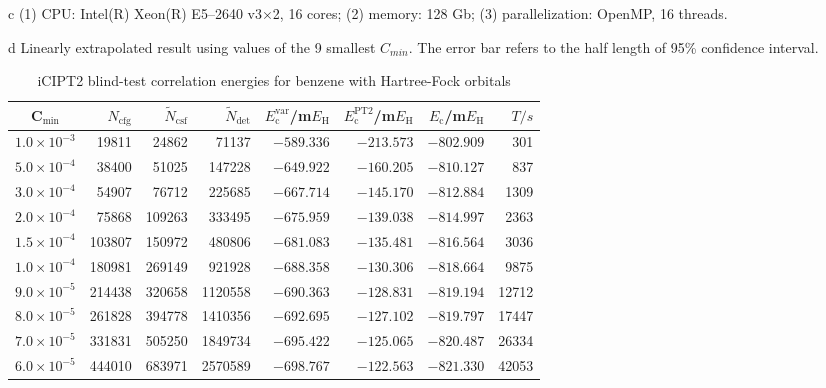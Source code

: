 \documentclass[journal=jcp,manuscript=suppinfo]{achemso}
\begin{document}
\begin{table}[!htp]
\begin{threeparttable}
\begin{tablenotes}
\item[c](1) CPU: Intel(R) Xeon(R) E5--2640 v3$\times$2, 16 cores; (2) memory: 128 Gb;
			(3) parallelization: OpenMP, 16 threads.
\item[d]Linearly extrapolated result using values of the 9 smallest $C_{min}$. The error bar refers to the half length of 95\% confidence interval.
		\end{tablenotes}
	\end{threeparttable}
	\label{OldNO}
\end{table}

\begin{table}[!htp]
	\small
	\caption{iCIPT2 blind-test correlation energies for benzene with Hartree-Fock orbitals }
	\begin{threeparttable}
		\centering
	\begin{tabular}{c|rrrrrrr}\toprule
		C$_{\text{min}}$&$N_{\mathrm{cfg}}$&$\tilde{N}_{\mathrm{csf}}$\tnote{a}&$\tilde{N}_{\mathrm{det}}$\tnote{b}
		&$E_{\mathrm{c}}^{\mathrm{var}}$/m$E_{\text{H}}$&$E_{\mathrm{c}}^{\mathrm{PT2}}$/m$E_{\text{H}}$&$E_{\mathrm{c}}$/m$E_{\text{H}}$&$T/s$\tnote{c}\\\toprule
			$1.0\times10^{-3}$ &    19811 &    24862 &  71137&  $-589.336$  &  $-213.573$&  $-802.909$ &301  \\
			$5.0\times10^{-4}$ &    38400 &    51025 & 147228&  $-649.922$  &  $-160.205$&  $-810.127$ &837  \\
			$3.0\times10^{-4}$ &    54907 &    76712 & 225685&  $-667.714$  &  $-145.170$&  $-812.884$ &1309 \\
			$2.0\times10^{-4}$ &    75868 &   109263 & 333495&  $-675.959$  &  $-139.038$&  $-814.997$ &2363 \\
			$1.5\times10^{-4}$ &   103807 &   150972 & 480806&  $-681.083$  &  $-135.481$&  $-816.564$ &3036 \\
			$1.0\times10^{-4}$ &   180981 &   269149 & 921928&  $-688.358$  &  $-130.306$&  $-818.664$ &9875 \\
			$9.0\times10^{-5}$ &   214438 &   320658 &1120558&  $-690.363$  &  $-128.831$&  $-819.194$ &12712\\
			$8.0\times10^{-5}$ &   261828 &   394778 &1410356&  $-692.695$  &  $-127.102$&  $-819.797$ &17447\\
			$7.0\times10^{-5}$ &   331831 &   505250 &1849734&  $-695.422$  &  $-125.065$&  $-820.487$ &26334\\
			$6.0\times10^{-5}$ &   444010 &   683971 &2570589&  $-698.767$  &  $-122.563$&  $-821.330$ &42053\\

\end{tabular}
\end{threeparttable}
\end{table}
\end{document}
